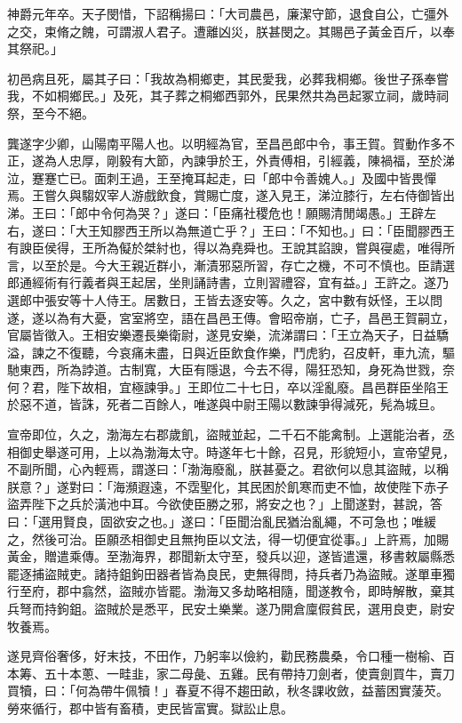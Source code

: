 \begin{pinyinscope}
神爵元年卒。天子閔惜，下詔稱揚曰：「大司農邑，廉潔守節，退食自公，亡彊外之交，束脩之餽，可謂淑人君子。遭離凶災，朕甚閔之。其賜邑子黃金百斤，以奉其祭祀。」

初邑病且死，屬其子曰：「我故為桐鄉吏，其民愛我，必葬我桐鄉。後世子孫奉嘗我，不如桐鄉民。」及死，其子葬之桐鄉西郭外，民果然共為邑起冢立祠，歲時祠祭，至今不絕。

龔遂字少卿，山陽南平陽人也。以明經為官，至昌邑郎中令，事王賀。賀動作多不正，遂為人忠厚，剛毅有大節，內諫爭於王，外責傅相，引經義，陳禍福，至於涕泣，蹇蹇亡已。面刺王過，王至掩耳起走，曰「郎中令善媿人。」及國中皆畏憚焉。王嘗久與騶奴宰人游戲飲食，賞賜亡度，遂入見王，涕泣膝行，左右侍御皆出涕。王曰：「郎中令何為哭？」遂曰：「臣痛社稷危也！願賜清閒竭愚。」王辟左右，遂曰：「大王知膠西王所以為無道亡乎？」王曰：「不知也。」曰：「臣聞膠西王有諛臣侯得，王所為儗於桀紂也，得以為堯舜也。王說其諂諛，嘗與寑處，唯得所言，以至於是。今大王親近群小，漸漬邪惡所習，存亡之機，不可不慎也。臣請選郎通經術有行義者與王起居，坐則誦詩書，立則習禮容，宜有益。」王許之。遂乃選郎中張安等十人侍王。居數日，王皆去逐安等。久之，宮中數有妖怪，王以問遂，遂以為有大憂，宮室將空，語在昌邑王傳。會昭帝崩，亡子，昌邑王賀嗣立，官屬皆徵入。王相安樂遷長樂衛尉，遂見安樂，流涕謂曰：「王立為天子，日益驕溢，諫之不復聽，今哀痛未盡，日與近臣飲食作樂，鬥虎豹，召皮軒，車九流，驅馳東西，所為誖道。古制寬，大臣有隱退，今去不得，陽狂恐知，身死為世戮，奈何？君，陛下故相，宜極諫爭。」王即位二十七日，卒以淫亂廢。昌邑群臣坐陷王於惡不道，皆誅，死者二百餘人，唯遂與中尉王陽以數諫爭得減死，髡為城旦。

宣帝即位，久之，渤海左右郡歲飢，盜賊並起，二千石不能禽制。上選能治者，丞相御史舉遂可用，上以為渤海太守。時遂年七十餘，召見，形貌短小，宣帝望見，不副所聞，心內輕焉，謂遂曰：「渤海廢亂，朕甚憂之。君欲何以息其盜賊，以稱朕意？」遂對曰：「海瀕遐遠，不霑聖化，其民困於飢寒而吏不恤，故使陛下赤子盜弄陛下之兵於潢池中耳。今欲使臣勝之邪，將安之也？」上聞遂對，甚說，答曰：「選用賢良，固欲安之也。」遂曰：「臣聞治亂民猶治亂繩，不可急也；唯緩之，然後可治。臣願丞相御史且無拘臣以文法，得一切便宜從事。」上許焉，加賜黃金，贈遣乘傳。至渤海界，郡聞新太守至，發兵以迎，遂皆遣還，移書敕屬縣悉罷逐捕盜賊吏。諸持鉏鉤田器者皆為良民，吏無得問，持兵者乃為盜賊。遂單車獨行至府，郡中翕然，盜賊亦皆罷。渤海又多劫略相隨，聞遂教令，即時解散，棄其兵弩而持鉤鉏。盜賊於是悉平，民安土樂業。遂乃開倉廩假貧民，選用良吏，尉安牧養焉。

遂見齊俗奢侈，好末技，不田作，乃躬率以儉約，勸民務農桑，令口種一樹榆、百本筹、五十本蔥、一畦韭，家二母彘、五雞。民有帶持刀劍者，使賣劍買牛，賣刀買犢，曰：「何為帶牛佩犢！」春夏不得不趨田畝，秋冬課收斂，益蓄困實蔆芡。勞來循行，郡中皆有畜積，吏民皆富實。獄訟止息。


\end{pinyinscope}
